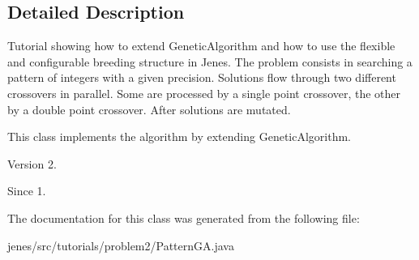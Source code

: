\subsection{Detailed Description}
Tutorial showing how to extend {\ttfamily Genetic\-Algorithm} and how to use the flexible and configurable breeding structure in Jenes. The problem consists in searching a pattern of integers with a given precision. Solutions flow through two different crossovers in parallel. Some are processed by a single point crossover, the other by a double point crossover. After solutions are mutated.

This class implements the algorithm by extending {\ttfamily Genetic\-Algorithm}.

\begin{DoxyVersion}{Version}
2. 
\end{DoxyVersion}
\begin{DoxySince}{Since}
1. 
\end{DoxySince}


The documentation for this class was generated from the following file\-:\begin{DoxyCompactItemize}
\item 
jenes/src/tutorials/problem2/Pattern\-G\-A.\-java\end{DoxyCompactItemize}
